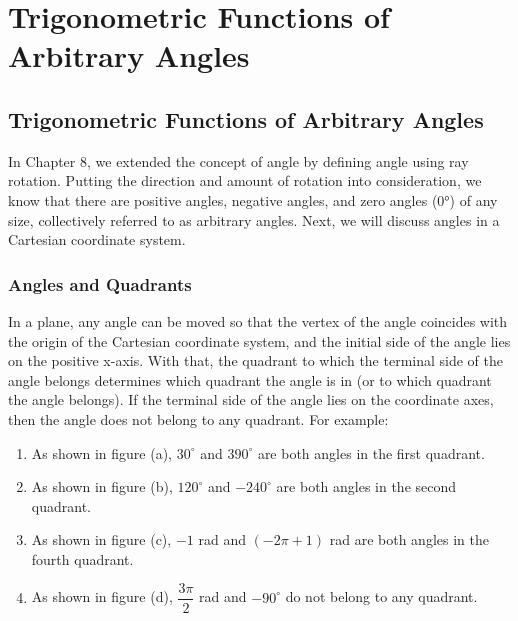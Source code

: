 \documentclass{report}
\begin{document}
\pagestyle{fancy}
\fancyhead{} %
\fancyhead[RO,LE]{\thepage}
\fancyhead[LO,RE]{\leftmark}
\fancyfoot{} %

\fancyfoot[RO,RE]{\thepage}

\onehalfspacing
\setcounter{chapter}{8}

\chapter{Trigonometric Functions of Arbitrary Angles}

\section{Trigonometric Functions of Arbitrary Angles}

In Chapter 8, we extended the concept of angle by defining angle using ray rotation. Putting the direction and amount of rotation into consideration, we know that there are positive angles, negative angles, and zero angles (0°) of any size, collectively referred to as arbitrary angles. Next, we will discuss angles in a Cartesian coordinate system.

\subsection*{Angles and Quadrants}

In a plane, any angle can be moved so that the vertex of the angle coincides with the origin of the Cartesian coordinate system, and the initial side of the angle lies on the positive x-axis. With that, the quadrant to which the terminal side of the angle belongs determines which quadrant the angle is in (or to which quadrant the angle belongs). If the terminal side of the angle lies on the coordinate axes, then the angle does not belong to any quadrant. For example:
\vspace{-1em}
\begin{enumerate}[label=(\arabic*)]
    \item As shown in figure (a), $30^\circ$ and $390^\circ$ are both angles in the first quadrant.
    \item As shown in figure (b), $120^\circ$ and $-240^\circ$ are both angles in the second quadrant.
    \item As shown in figure (c), $-1$ rad and $(-2\pi + 1)$ rad are both angles in the fourth quadrant.
    \item As shown in figure (d), $\dfrac{3\pi}{2}$ rad and $-90^\circ$ do not belong to any quadrant.
\end{enumerate}
\end{document}
